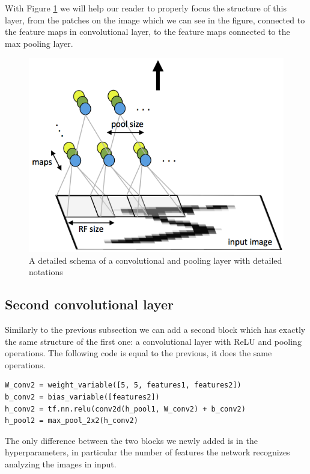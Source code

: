 With Figure \ref{fig:conv_layer} we will help our reader to properly focus the structure of this layer, from the patches on the image which we can see in the figure, connected to the feature maps in convolutional layer, to the feature maps connected to the max pooling layer.

\begin{figure}
	\caption{A detailed schema of a convolutional and pooling layer with detailed notations}
	\label{fig:conv_layer}
	\centering
	\includegraphics[width=1\textwidth]{Images/conv_layer}
\end{figure}

\subsection{Second convolutional layer}

Similarly to the previous subsection we can add a second block which has exactly the same structure of the first one: a convolutional layer with ReLU and pooling operations. The following code is equal to the previous, it does the same operations.

\begin{lstlisting}
W_conv2 = weight_variable([5, 5, features1, features2])
b_conv2 = bias_variable([features2])
h_conv2 = tf.nn.relu(conv2d(h_pool1, W_conv2) + b_conv2)
h_pool2 = max_pool_2x2(h_conv2)
\end{lstlisting}

The only difference between the two blocks we newly added is in the hyperparameters, in particular the number of features the network recognizes analyzing the images in input.

